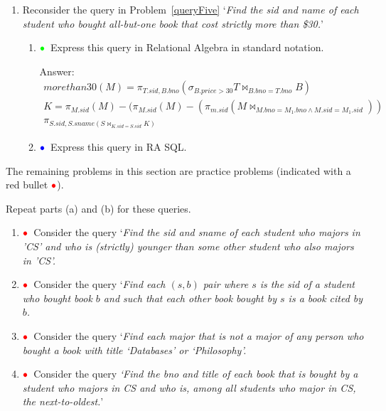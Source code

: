 \documentclass[11pt]{article}
\newcommand{\red}[1]{{\color{red}#1}}
\newcommand{\green}[1]{{\color{green}#1}}
\newcommand{\blue}[1]{{\color{blue}#1}}
\newcommand{\redbullet}{$\red{\bullet}$}
\newcommand{\greenbullet}{$\green{\bullet}$}
\newcommand{\bluebullet}{$\blue{\bullet}$}
\begin{document}
\begin{enumerate}[resume]
\item Reconsider the query in Problem~\ref{queryFive}
`\emph{Find the sid and name of each student who bought all-but-one book that cost strictly more than \$30.}'

     \begin{enumerate}
    
     \item  \greenbullet\  Express this query in Relational Algebra in standard notation.
     
     Answer:
     {
     \[
  \begin{array}{l}
  morethan30(M) =\pi_{T.sid,B.bno}(\sigma_{B.price>30}T\bowtie_{B.bno=T.bno}B) \\
  K=\pi_{M.sid}(M) - (\pi_{M.sid}( M) -(\pi_{m.sid}(M\bowtie_{M.bno=M_1.bno\land M.sid = M_1.sid}))\\
   \pi_{S.sid,S.sname(S\bowtie_{K.sid=S.sid}K)}
    \end{array}
\]
}

    

    
     \item  \bluebullet\  Express this query in RA SQL.
     \end{enumerate}


\end{enumerate}

\newpage
The remaining problems in this section are practice problems (indicated with a red bullet \redbullet).

Repeat parts (a) and (b) for these queries.

\begin{enumerate}[resume]
\item \redbullet\  Consider the query `\emph{Find the sid and sname of each student who majors in 'CS' and who is (strictly) younger than some other student who also majors in 'CS'.}

\item \redbullet\  Consider the query
`\emph{Find each $(s,b)$ pair where $s$ is the                                                     
sid of a student who bought book $b$ and such that                                                               
each other book bought by $s$ is a book cited by $b$.}

\item \redbullet\  Consider the query
`\emph{Find each major that is not a major of any person who bought a book with title `Databases' or `Philosophy'.}


\item \redbullet\  Consider the query \emph{`Find the bno and title of
each book that is bought by a student who majors in CS and who is,
among all students who major in CS, 
the next-to-oldest.}'   


\end{enumerate}
\end{document}
